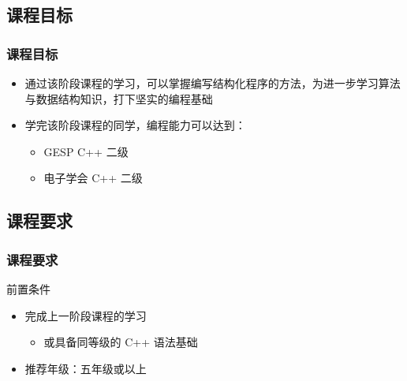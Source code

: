 \subsection{课程目标}

\begin{frame}[fragile]
    \frametitle{课程目标}

    \begin{itemize}[<+->]
        \item 通过该阶段课程的学习，可以掌握编写结构化程序的方法，为进一步学习算法与数据结构知识，打下坚实的编程基础

        \item 学完该阶段课程的同学，编程能力可以达到：

            \begin{itemize}
                \item GESP C++ 二级
                \item 电子学会 C++ 二级
            \end{itemize}

    \end{itemize}
\end{frame}

\subsection{课程要求}

\begin{frame}[fragile]
    \frametitle{课程要求}

    \begin{alertblock}{前置条件}
        \begin{itemize}
            \item 完成上一阶段课程的学习

                \begin{itemize}
                    \item 或具备同等级的 C++ 语法基础
                \end{itemize}

            \item 推荐年级：五年级或以上
        \end{itemize}
    \end{alertblock}
\end{frame}


